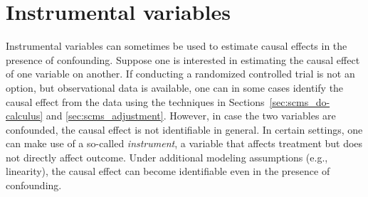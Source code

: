 \section{Instrumental variables}

Instrumental variables can sometimes be used to estimate causal effects in the presence of confounding.
Suppose one is interested in estimating the causal effect of one variable on another. If conducting a randomized
controlled trial is not an option, but observational data is available, one can in some cases identify the 
causal effect from the data using the techniques in Sections~\ref{sec:scms_do-calculus} and \ref{sec:scms_adjustment}.
However, in case the two variables are confounded, the causal effect is not identifiable in general.
In certain settings, one can make use of a so-called \emph{instrument}, a variable that affects treatment but does not
directly affect outcome. Under additional modeling assumptions (e.g., linearity), the causal effect can become
identifiable even in the presence of confounding.

